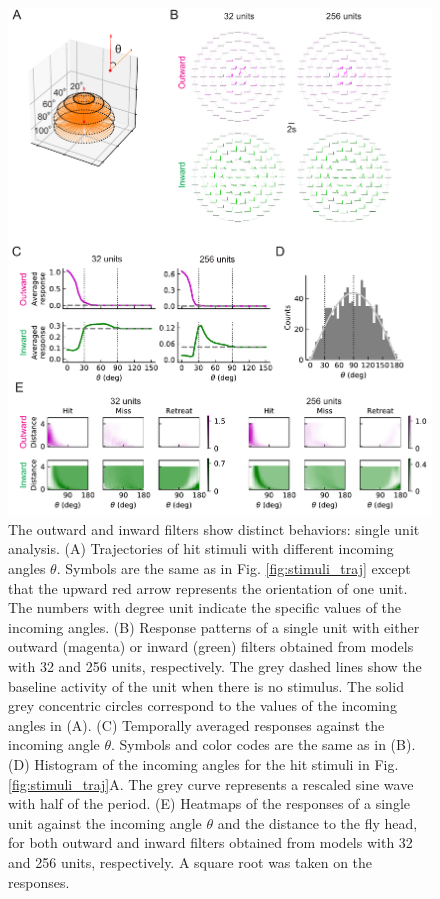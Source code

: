 \documentclass[pdftex,9pt,lineno]{elife}
\begin{document}
\begin{figure}
\includegraphics[width=\linewidth]{figures/compare_outward_inward_single_unit_paper.pdf}
\caption{The outward and inward filters show distinct behaviors: single unit analysis. (A) Trajectories of hit stimuli with different incoming angles $\theta$. Symbols are the same as in Fig. \ref{fig:stimuli_traj} except that the upward red arrow represents the orientation of one unit. The numbers with degree unit indicate the specific values of the incoming angles. (B) Response patterns of a single unit with either outward (magenta) or inward (green) filters obtained from models with 32 and 256 units, respectively. The grey dashed lines show the baseline activity of the unit when there is no stimulus. The solid grey concentric circles correspond to the values of the incoming angles in (A). (C) Temporally averaged responses against the incoming angle $\theta$. Symbols and color codes are the same as in (B). (D) Histogram of the incoming angles for the hit stimuli in Fig. \ref{fig:stimuli_traj}A. The grey curve represents a rescaled sine wave with half of the period. (E) Heatmaps of the responses of a single unit against the incoming angle $\theta$ and the distance to the fly head, for both outward and inward filters obtained from models with 32 and 256 units, respectively. A square root was taken on the responses.}

\end{figure}
\end{document}
